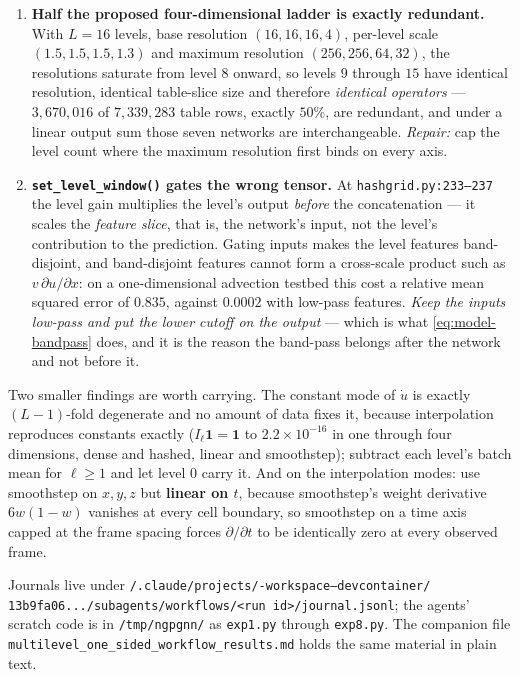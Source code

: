 \documentclass[11pt,a4paper]{article}
\begin{document}
\begin{enumerate}[leftmargin=1.6em,itemsep=5pt]
\item \textbf{Half the proposed four-dimensional ladder is exactly redundant.} With
$L=16$ levels, base resolution $(16,16,16,4)$, per-level scale $(1.5,1.5,1.5,1.3)$ and
maximum resolution $(256,256,64,32)$, the resolutions saturate from level $8$ onward, so
levels $9$ through $15$ have identical resolution, identical table-slice size and therefore
\emph{identical operators} --- $3{,}670{,}016$ of $7{,}339{,}283$ table rows, exactly $50\%$,
are redundant, and under a linear output sum those seven networks are interchangeable.
\emph{Repair:} cap the level count where the maximum resolution first binds on every axis.

\item \textbf{\texttt{set\_level\_window()} gates the wrong tensor.} At
\texttt{hashgrid.py:233--237} the level gain multiplies the level's output \emph{before}
the concatenation --- it scales the \emph{feature slice}, that is, the network's input, not
the level's contribution to the prediction. Gating inputs makes the level features
band-disjoint, and band-disjoint features cannot form a cross-scale product such as
$v\,\partial u/\partial x$: on a one-dimensional advection testbed this cost a relative mean
squared error of $0.835$, against $0.0002$ with low-pass features. \emph{Keep the inputs
low-pass and put the lower cutoff on the output} --- which is what \eqref{eq:model-bandpass}
does, and it is the reason the band-pass belongs after the network and not before it.
\end{enumerate}

\noindent
Two smaller findings are worth carrying. The constant mode of $\dot u$ is exactly
$(L-1)$-fold degenerate and no amount of data fixes it, because interpolation reproduces
constants exactly ($I_\ell \mathbf{1} = \mathbf{1}$ to $2.2\times10^{-16}$ in one through
four dimensions, dense and hashed, linear and smoothstep); subtract each level's batch mean
for $\ell \geq 1$ and let level $0$ carry it. And on the interpolation modes: use smoothstep
on $x,y,z$ but \textbf{linear on $t$}, because smoothstep's weight derivative $6w(1-w)$
vanishes at every cell boundary, so smoothstep on a time axis capped at the frame spacing
forces $\partial/\partial t$ to be identically zero at every observed frame.

\noindent
Journals live under
\texttt{\raisebox{0.3ex}{\texttildelow}/.claude/projects/-workspace--devcontainer/}
\texttt{13b9fa06.../subagents/workflows/<run id>/journal.jsonl}; the agents' scratch code is
in \texttt{/tmp/ngpgnn/} as \texttt{exp1.py} through \texttt{exp8.py}. The companion file
\texttt{multilevel\_one\_sided\_workflow\_results.md} holds the same material in plain text.
\end{document}
